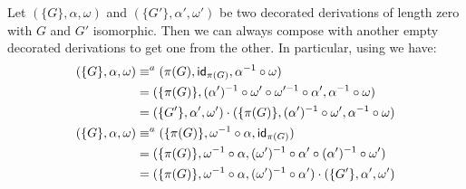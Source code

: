 \begin{remark}\label{ex:zero}
Let $(\{G\}, \alpha, \omega)$ and $(\{G'\}, \alpha', \omega')$ be two decorated derivations of length zero with $G$ and $G'$ isomorphic. Then we can always compose with another empty decorated derivations to get one from the other. In particular, using  we have:
\begin{align*}
(\{G\}, \alpha, \omega)&\equiv^{a} (\pi(G), \mathsf{id}_{\pi(G)}, \alpha^{-1}\circ \omega)\\&=(\{\pi(G)\}, (\alpha')^{-1}\circ \omega'\circ \omega'^{-1} \circ \alpha', \alpha^{-1}\circ \omega)\\&=(\{G'\}, \alpha', \omega')\cdot (\{\pi(G)\}, (\alpha')^{-1}\circ \omega', \alpha^{-1}\circ \omega)
\\(\{G\}, \alpha, \omega)&\equiv^{a} (\{\pi(G)\}, 	\omega^{-1}\circ \alpha, \mathsf{id}_{\pi(G)})\\&=(\{\pi(G)\}, \omega^{-1}\circ \alpha, (\omega')^{-1}\circ\alpha'\circ (\alpha')^{-1} \circ \omega')\\&= (\{\pi(G)\}, \omega^{-1}\circ \alpha, (\omega')^{-1}\circ\alpha') \cdot (\{G'\}, \alpha', \omega')
\end{align*}
\end{remark}

